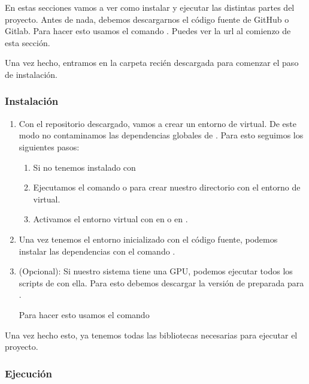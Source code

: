 En estas secciones vamos a ver como instalar y ejecutar las distintas partes del proyecto. Antes de nada, debemos descargarnos el código fuente de GitHub o Gitlab. Para hacer esto usamos el comando . Puedes ver la url al comienzo de esta sección.

Una vez hecho, entramos en la carpeta recién descargada para comenzar el paso de instalación.

\subsubsection{Instalación}
\begin{enumerate}
  \item Con el repositorio descargado, vamos a crear un entorno de  virtual. De este modo no contaminamos las dependencias globales de . Para esto seguimos los siguientes pasos:
        \begin{enumerate}
          \item Si no tenemos instalado con 
          \item Ejecutamos el comando  o  para crear nuestro directorio  con el entorno de  virtual.
          \item Activamos el entorno virtual con  en  o  en .
        \end{enumerate}

  \item Una vez tenemos el entorno inicializado con el código fuente, podemos instalar las dependencias con el comando .

  \item (Opcional): Si nuestro sistema tiene una GPU, podemos ejecutar todos los scripts de  con ella. Para esto debemos descargar la versión de  preparada para .

        Para hacer esto usamos el comando 
\end{enumerate}

Una vez hecho esto, ya tenemos todas las bibliotecas necesarias para ejecutar el proyecto.

\subsubsection{Ejecución}

